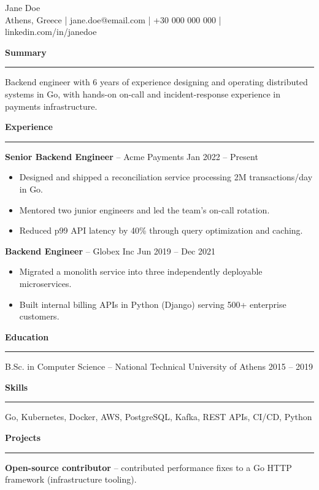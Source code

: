 \documentclass[11pt]{article}
\newcommand{\sechead}[1]{\vspace{8pt}\noindent\textbf{\large #1}\\\rule{\linewidth}{0.5pt}}
\begin{document}
\begin{center}
  {\LARGE Jane Doe} \\
  Athens, Greece \quad | \quad jane.doe@email.com \quad | \quad +30 000 000 000 \quad | \quad linkedin.com/in/janedoe
\end{center}

\sechead{Summary}
Backend engineer with 6 years of experience designing and operating distributed systems
in Go, with hands-on on-call and incident-response experience in payments infrastructure.

\sechead{Experience}
\textbf{Senior Backend Engineer} -- Acme Payments \hfill Jan 2022 -- Present \\
\begin{itemize}[leftmargin=*, nosep]
  \item Designed and shipped a reconciliation service processing 2M transactions/day in Go.
  \item Mentored two junior engineers and led the team's on-call rotation.
  \item Reduced p99 API latency by 40\% through query optimization and caching.
\end{itemize}

\textbf{Backend Engineer} -- Globex Inc \hfill Jun 2019 -- Dec 2021 \\
\begin{itemize}[leftmargin=*, nosep]
  \item Migrated a monolith service into three independently deployable microservices.
  \item Built internal billing APIs in Python (Django) serving 500+ enterprise customers.
\end{itemize}

\sechead{Education}
B.Sc. in Computer Science -- National Technical University of Athens \hfill 2015 -- 2019

\sechead{Skills}
Go, Kubernetes, Docker, AWS, PostgreSQL, Kafka, REST APIs, CI/CD, Python

\sechead{Projects}
\textbf{Open-source contributor} -- contributed performance fixes to a Go HTTP framework
(infrastructure tooling).
\end{document}
